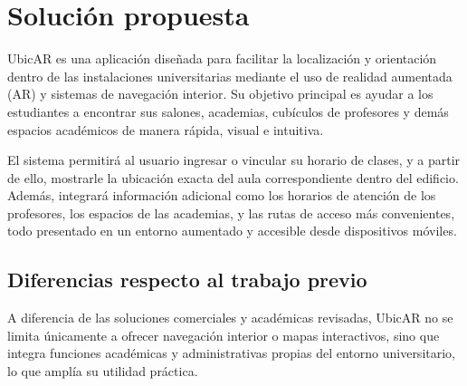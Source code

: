 \section{Solución propuesta}

UbicAR es una aplicación diseñada para facilitar la localización y orientación dentro de las instalaciones universitarias mediante el uso de realidad aumentada (AR) y sistemas de navegación interior. Su objetivo principal es ayudar a los estudiantes a encontrar sus salones, academias, cubículos de profesores y demás espacios académicos de manera rápida, visual e intuitiva.

El sistema permitirá al usuario ingresar o vincular su horario de clases, y a partir de ello, mostrarle la ubicación exacta del aula correspondiente dentro del edificio. Además, integrará información adicional como los horarios de atención de los profesores, los espacios de las academias, y las rutas de acceso más convenientes, todo presentado en un entorno aumentado y accesible desde dispositivos móviles.

\subsection{Diferencias respecto al trabajo previo}

A diferencia de las soluciones comerciales y académicas revisadas, UbicAR no se limita únicamente a ofrecer navegación interior o mapas interactivos, sino que integra funciones académicas y administrativas propias del entorno universitario, lo que amplía su utilidad práctica.

